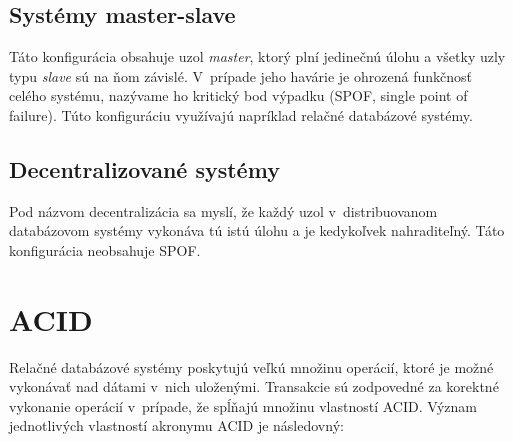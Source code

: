 \documentclass[11pt,twoside,a4paper]{book}
\begin{document}
\subsection*{Systémy master-slave} 

Táto konfigurácia obsahuje uzol \emph{master}, ktorý plní jedinečnú úlohu a všetky uzly typu \emph{slave} sú na ňom závislé. V~prípade jeho havárie je ohrozená funkčnosť celého systému, nazývame ho kritický bod výpadku (SPOF, single point of failure). Túto konfiguráciu využívajú napríklad relačné databázové systémy.

\subsection*{Decentralizované systémy}

Pod názvom decentralizácia sa myslí, že každý uzol v~distribuovanom databázovom systémy vykonáva tú istú úlohu a je kedykoľvek nahraditeľný. Táto konfigurácia neobsahuje SPOF.


\section{ACID}

Relačné databázové systémy poskytujú veľkú množinu operácií, ktoré je možné vykonávať nad dátami v~nich uloženými. Transakcie \cite{gray1981transaction, haerder1983principles} sú zodpovedné za korektné vykonanie operácií v~prípade, že spĺňajú množinu vlastností ACID. Význam jednotlivých vlastností akronymu ACID je následovný:
\end{document}

